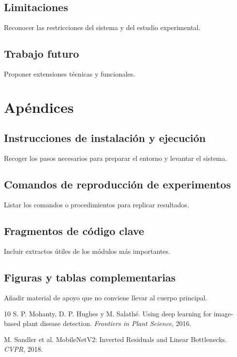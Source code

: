 \documentclass[11pt,spanish,listoffigures,listoftables]{tfgetsinf}
\begin{document}
\section{Limitaciones}
Reconocer las restricciones del sistema y del estudio experimental.

\section{Trabajo futuro}
Proponer extensiones técnicas y funcionales.

\chapter{Apéndices}
\section{Instrucciones de instalación y ejecución}
Recoger los pasos necesarios para preparar el entorno y levantar el sistema.

\section{Comandos de reproducción de experimentos}
Listar los comandos o procedimientos para replicar resultados.

\section{Fragmentos de código clave}
Incluir extractos útiles de los módulos más importantes.

\section{Figuras y tablas complementarias}
Añadir material de apoyo que no conviene llevar al cuerpo principal.

\backmatter
\begin{thebibliography}{10}
S. P. Mohanty, D. P. Hughes y M. Salathé.
\newblock Using deep learning for image-based plant disease detection.
\newblock \textit{Frontiers in Plant Science}, 2016.

M. Sandler et al.
\newblock MobileNetV2: Inverted Residuals and Linear Bottlenecks.
\newblock \textit{CVPR}, 2018.
\end{thebibliography}
\end{document}
